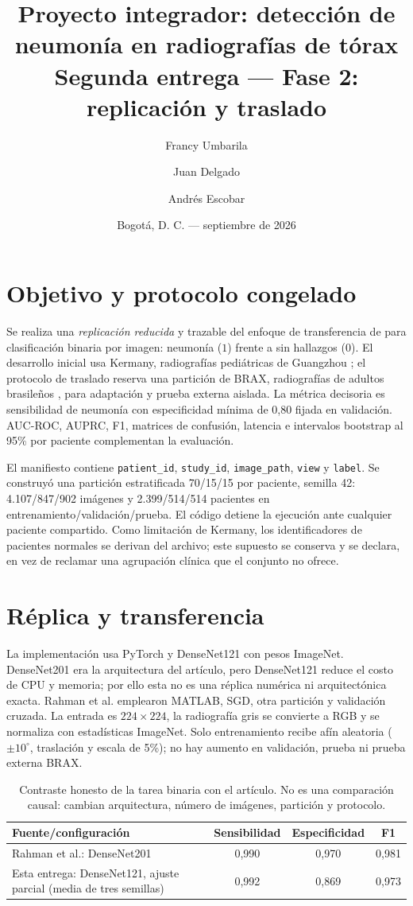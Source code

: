 \documentclass[11pt]{article}
\title{Proyecto integrador: detección de neumonía en radiografías de tórax\\\large Segunda entrega --- Fase 2: replicación y traslado}
\author{Francy Umbarila \and Juan Delgado \and Andrés Escobar}
\date{Bogotá, D. C. --- septiembre de 2026}
\begin{document}
\maketitle
\section{Objetivo y protocolo congelado}
Se realiza una \emph{replicación reducida} y trazable del enfoque de transferencia de \textcite{rahman2020} para clasificación binaria por imagen: neumonía ($1$) frente a sin hallazgos ($0$). El desarrollo inicial usa Kermany, radiografías pediátricas de Guangzhou \parencite{kermany2018}; el protocolo de traslado reserva una partición de BRAX, radiografías de adultos brasileños \parencite{reis2022a}, para adaptación y prueba externa aislada. La métrica decisoria es sensibilidad de neumonía con especificidad mínima de 0,80 fijada en validación. AUC-ROC, AUPRC, F1, matrices de confusión, latencia e intervalos bootstrap al 95\% por paciente complementan la evaluación.

El manifiesto contiene \texttt{patient\_id}, \texttt{study\_id}, \texttt{image\_path}, \texttt{view} y \texttt{label}. Se construyó una partición estratificada 70/15/15 por paciente, semilla 42: 4.107/847/902 imágenes y 2.399/514/514 pacientes en entrenamiento/validación/prueba. El código detiene la ejecución ante cualquier paciente compartido. Como limitación de Kermany, los identificadores de pacientes normales se derivan del archivo; este supuesto se conserva y se declara, en vez de reclamar una agrupación clínica que el conjunto no ofrece.

\section{Réplica y transferencia}
La implementación usa PyTorch y DenseNet121 con pesos ImageNet. DenseNet201 era la arquitectura del artículo, pero DenseNet121 reduce el costo de CPU y memoria; por ello esta no es una réplica numérica ni arquitectónica exacta. Rahman et al. emplearon MATLAB, SGD, otra partición y validación cruzada. La entrada es $224\times224$, la radiografía gris se convierte a RGB y se normaliza con estadísticas ImageNet. Solo entrenamiento recibe afín aleatoria ($\pm10^\circ$, traslación y escala de 5\%); no hay aumento en validación, prueba ni prueba externa BRAX.

\begin{table}[h]\centering\small
\caption{Contraste honesto de la tarea binaria con el artículo. No es una comparación causal: cambian arquitectura, número de imágenes, partición y protocolo.}\label{tab:replica}
\begin{tabular}{lccc}\toprule
Fuente/configuración & Sensibilidad & Especificidad & F1 \\\midrule
Rahman et al.: DenseNet201 & 0,990 & 0,970 & 0,981\\
Esta entrega: DenseNet121, ajuste parcial (media de tres semillas) & 0,992 & 0,869 & 0,973\\\bottomrule
\end{tabular}
\end{table}
\end{document}
